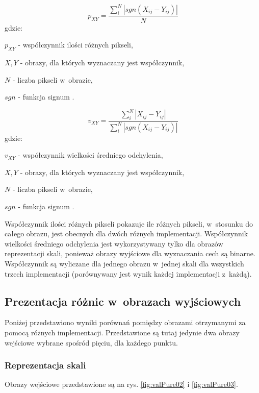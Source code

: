 \begin{equation}
\label{eq:procentZlychPikseli}
p_{XY} = \frac{\sum_{i}^{N}|sgn(X_{ij}-Y_{ij})	|}{N}
\end{equation}
gdzie:

$ p_{XY} $ - współczynnik ilości różnych pikseli,

$ X, Y $ - obrazy, dla których wyznaczany jest współczynnik,

$ N $ - liczba pikseli w~obrazie,

$ sgn $ - funkcja signum \cite{Signum}.

\begin{equation}
\label{eq:sredniaOdchylenia}
v_{XY} = \frac{\sum_{i}^{N}|X_{ij}-Y_{ij}|}{\sum_{i}^{N}|sgn(X_{ij}-Y_{ij})|}
\end{equation}
gdzie:

$ v_{XY} $ - współczynnik wielkości średniego odchylenia,

$ X, Y $ - obrazy, dla których wyznaczany jest współczynnik,

$ N $ - liczba pikseli w~obrazie,

$ sgn $ - funkcja signum \cite{Signum}.

Współczynnik ilości różnych pikseli pokazuje ile różnych pikseli, w~stosunku do całego obrazu, jest obecnych dla dwóch różnych implementacji. Współczynnik wielkości średniego odchylenia jest wykorzystywany tylko dla obrazów reprezentacji skali, ponieważ obrazy wyjściowe dla wyznaczania cech są binarne. Współczynnik są wyliczane dla jednego obrazu w~jednej skali dla wszystkich trzech implementacji (porównywany jest wynik każdej implementacji z~każdą).

\subsection{Prezentacja różnic w~obrazach wyjściowych}
\label{subsec:prezentacjaObrazowRoznicowych}

Poniżej przedstawiono wyniki porównań pomiędzy obrazami otrzymanymi za pomocą różnych implementacji. Przedstawione są tutaj jedynie dwa obrazy wejściowe wybrane spośród pięciu, dla każdego punktu.

\subsubsection{Reprezentacja skali}
\label{subsubsec:reprezentacjaSkaliRysunki}

Obrazy wejściowe przedstawione są na rys. \ref{fig:valPure02} i \ref{fig:valPure03}.


